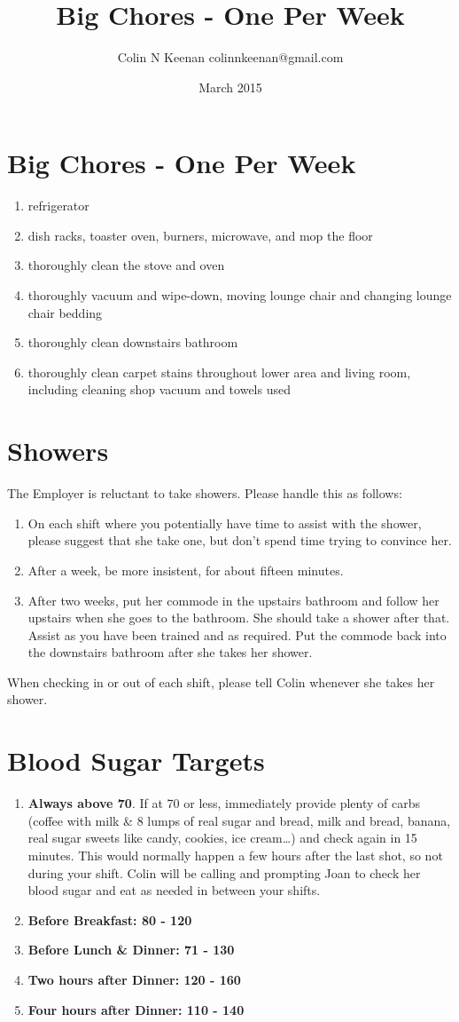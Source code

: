 \documentclass[12pt,letterpaper]{article}
\newcommand{\mytitle}{Big Chores - One Per Week}
\begin{document}
\title{\mytitle{}}
\author{Colin N Keenan colinnkeenan@gmail.com}
\date{March 2015}
\section*{\mytitle{}}
\begin{enumerate}
	\item refrigerator
	\item dish racks, toaster oven, burners, microwave, and mop the floor
	\item thoroughly clean the stove and oven
	\item thoroughly vacuum and wipe-down, moving lounge chair and changing lounge chair bedding
	\item thoroughly clean downstairs bathroom
	\item thoroughly clean carpet stains throughout lower area and living room, including cleaning shop vacuum and towels used
\end{enumerate}
\section*{Showers}
The Employer is reluctant to take showers. Please handle this as follows:
\begin{enumerate}
	\item On each shift where you potentially have time to assist with the shower, please suggest that she take one, but don't spend time trying to convince her.
	\item After a week, be more insistent, for about fifteen minutes.
	\item After two weeks, put her commode in the upstairs bathroom and follow her upstairs when she goes to the bathroom. She should take a shower after that. Assist as you have been trained and as required. Put the commode back into the downstairs bathroom after she takes her shower.
\end{enumerate}
When checking in or out of each shift, please tell Colin whenever she takes her shower.
\section{Blood Sugar Targets}
\begin{enumerate}
	\item \textbf{Always above 70}. If at 70 or less, immediately provide plenty of carbs (coffee with milk \& 8 lumps of real sugar and bread, milk and bread, banana, real sugar sweets like candy, cookies, ice cream\ldots) and check again in 15 minutes. This would normally happen a few hours after the last shot, so not during your shift. Colin will be calling and prompting Joan to check her blood sugar and eat as needed in between your shifts.
	\item \textbf{Before Breakfast: 80 - 120}
	\item \textbf{Before Lunch \& Dinner: 71 - 130}
	\item \textbf{Two hours after Dinner: 120 - 160}
	\item \textbf{Four hours after Dinner: 110 - 140}
\end{enumerate}
\end{document}
